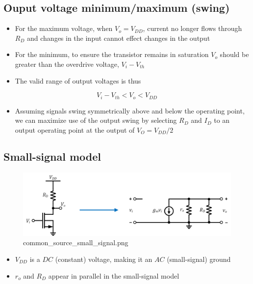\documentclass[11pt]{article}
\providecommand{\tightlist}{%
      \setlength{\itemsep}{0pt}\setlength{\parskip}{0pt}}
\begin{document}
    \hypertarget{ouput-voltage-minimummaximum-swing}{%
\subsection{Ouput voltage minimum/maximum
(swing)}\label{ouput-voltage-minimummaximum-swing}}

    \begin{itemize}
\tightlist
\item
  For the maximum voltage, when \(V_o = V_{DD}\), current no longer
  flows through \(R_D\) and changes in the input cannot effect changes
  in the output
\item
  For the minimum, to ensure the transistor remains in saturation
  \(V_o\) should be greater than the overdrive voltage, \(V_i - V_{th}\)
\item
  The valid range of output voltages is thus
\end{itemize}

\begin{equation}
V_i - V_{th} < V_o < V_{DD}
\end{equation}

\begin{itemize}
\tightlist
\item
  Assuming signals swing symmetrically above and below the operating
  point, we can maximize use of the output swing by selecting \(R_D\)
  and \(I_D\) to an output operating point at the output of
  \(V_O = V_{DD}/2\)
\end{itemize}

    \hypertarget{small-signal-model}{%
\subsection{Small-signal model}\label{small-signal-model}}

    \begin{figure}
\centering
\includegraphics{common_source_small_signal.png}
\caption{common\_source\_small\_signal.png}
\end{figure}

    \begin{itemize}
\tightlist
\item
  \(V_{DD}\) is a \(DC\) (constant) voltage, making it an \(AC\)
  (small-signal) ground
\item
  \(r_o\) and \(R_D\) appear in parallel in the small-signal model
\end{itemize}
\end{document}
